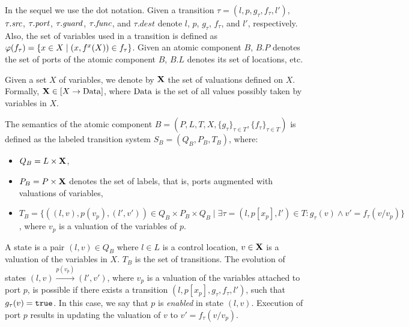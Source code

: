 In the sequel we use the dot notation.
Given a transition $\tau = (l,p,g_\tau,f_\tau,l')$, $\tau.\mathit{src}$, $\tau.\mathit{port}$, $\tau.\mathit{guard}$, $\tau.\mathit{func}$, and $\tau.dest$ denote $l$, $p$, $g_\tau$, $f_\tau$, and $l'$, respectively.
Also, the set of variables used in a transition is defined as $\varphi(f_\tau) = \{x \in X \mid (x,f^x(X)) \in f_\tau\}$.
Given an atomic component $B$, $B.P$ denotes the set of ports of the atomic component $B$, $B.L$ denotes its set of locations, etc.

Given a set $X$ of variables, we denote by $\mathbf{X}$ the set of valuations
defined on $X$. Formally, $\mathbf{X} \in [X \rightarrow \mathit{\mathrm{Data}}]$, where
$\mathit{\mathrm{Data}}$ is the set of all values possibly taken by variables in $X$.

%
%
\begin{definition}
\label{def:semantic-atom}
The semantics of the atomic component $B = (P,L, T, X, \{g_{\tau}\}_{\tau \in T}, \{f_{\tau}\}_{\tau \in T})$ is defined as the labeled transition system  $S_B = (Q_B, P_B, T_B)$, where: 
\begin{itemize}
\item $Q_B = L\times \mathbf{X}$, %
\item $P_B = P \times \mathbf{X}$ denotes the set of labels, that is, ports augmented with valuations of variables, 
\item $T_B= \{ ((l,v),p(v_{p}), (l',v'))\in Q_B\times P_B\times Q_B \mid \exists \tau = (l, p[x_{p}], l') \in T: g_{\tau}(v) \wedge v'=f_{\tau}(v/v_{p})\}$, where $v_{p}$ is a valuation of the variables of $p$.  
\end{itemize}
\end{definition}
%
A state is a pair $(l,v)\in Q_B$ where $l \in L$ is a control location, $v \in \mathbf{X}$ is a valuation of the variables in $X$.  $T_B$ is the set of transitions. The evolution of states $(l, v)\stackrel{p(v_{p})}{\rightarrow} (l', v')$, where $v_{p}$ is a valuation of the variables attached to port $p$, is possible if there exists a transition $(l, p[x_p], g_\tau, f_\tau, l')$, such that $g_\tau(v)=\mathtt{true}$. In this case, we say that $p$ is \emph{enabled} in state $(l, v)$. Execution of port $p$ results in updating the valuation of $v$ to $v'=f_\tau(v/v_p)$.

